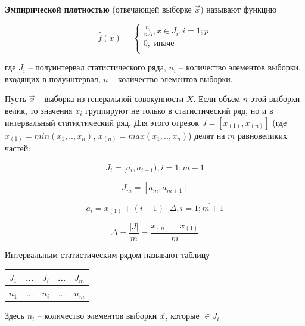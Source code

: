 \documentclass[a4paper,oneside,12pt]{extreport}
\theoremstyle{indented}
\begin{document}
\hfill 

    \textbf{Эмпирической плотностью} (отвечающей выборке $\vec x$) называют функцию

    \begin{equation*}
        \hat f(x) =
        \begin{cases}
            \frac{n_i}{n \Delta}, x \in J_i, i = \overline{1; p} \\
            0, \text{ иначе} \\
        \end{cases}
    \end{equation*}

где $J_i$ -- полуинтервал статистического ряда, $n_i$ -- количество элементов выборки, входящих в полуинтервал, $n$ -- количество элементов выборки.

\hfill

Пусть $\vec x$ -- выборка из генеральной совокупности $X$. Если объем $n$ этой выборки велик, то значения $x_i$ группируют не только в статистический ряд, но и в интервальный статистический ряд. Для этого отрезок
$J = [x_{(1)}, x_{(n)}]$ (где $x_{(1)}=min(x_1,..,x_n)$, $x_{(n)}=max(x_1,..,x_n)$) делят на $m$ равновеликих частей:

\begin{equation*}
    J_i = [a_i, a_{i+1}), i = \overline{1; m - 1}
\end{equation*}

\begin{equation*}
    J_{m} = [a_{m}, a_{m+1}]
\end{equation*}

$$a_i = x_{(1)} + (i-1)\cdot\Delta, i = \overline{1;m+1}$$

$$\Delta = \frac{|J|}{m} = \frac{x_{(n)} - x_{(1)}}{m}$$

    Интервальным статистическим рядом называют таблицу

    \begin{table}[H]
        \centering
        \begin{tabular}{|c|c|c|c|c|}
            \hline
            $J_1$ & ... & $J_i$ & ... & $J_m$ \\
            \hline
            $n_1$ & ... & $n_i$ & ... & $n_m$ \\
            \hline
        \end{tabular}
    \end{table}

    Здесь $n_i$ -- количество элементов выборки $\vec x$, которые
    $\in J_i$
    
\end{document}
